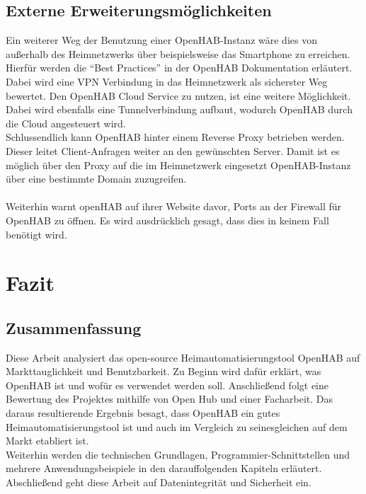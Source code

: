 \subsection{Externe Erweiterungsmöglichkeiten}
Ein weiterer Weg der Benutzung einer OpenHAB-Instanz wäre dies von außerhalb des Heimnetzwerks über beispielsweise das Smartphone zu erreichen. Hierfür werden die "`Best Practices"' in der OpenHAB Dokumentation erläutert.\\
Dabei wird eine VPN Verbindung in das Heimnetzwerk als sicherster Weg bewertet. Den OpenHAB Cloud Service zu nutzen, ist eine weitere Möglichkeit. Dabei wird ebenfalls eine Tunnelverbindung aufbaut, wodurch OpenHAB durch die Cloud angesteuert wird.\\
Schlussendlich kann OpenHAB hinter einem Reverse Proxy betrieben werden. Dieser leitet Client-Anfragen weiter an den gewünschten Server. Damit ist es möglich über den Proxy auf die im Heimnetzwerk eingesetzt OpenHAB-Instanz über eine bestimmte Domain zuzugreifen.\\
\\
Weiterhin warnt openHAB auf ihrer Website davor, Ports an der Firewall für OpenHAB zu öffnen. Es wird ausdrücklich gesagt, dass dies in keinem Fall benötigt wird.\cite{OPENHAB03:OH}

\section{Fazit}
\subsection{Zusammenfassung}
Diese Arbeit analysiert das open-source Heimautomatisierungstool OpenHAB auf Markttauglichkeit und Benutzbarkeit. Zu Beginn wird dafür erklärt, was OpenHAB ist und wofür es verwendet werden soll. Anschließend folgt eine Bewertung des Projektes mithilfe von Open Hub und einer Facharbeit. Das daraus resultierende Ergebnis besagt, dass OpenHAB ein gutes Heimautomatisierungstool ist und auch im Vergleich zu seinesgleichen auf dem Markt etabliert ist.\\
Weiterhin werden die technischen Grundlagen, Programmier-Schnittstellen und mehrere Anwendungsbeispiele in den darauffolgenden Kapiteln erläutert.\\
Abschließend geht diese Arbeit auf Datenintegrität und Sicherheit ein.

